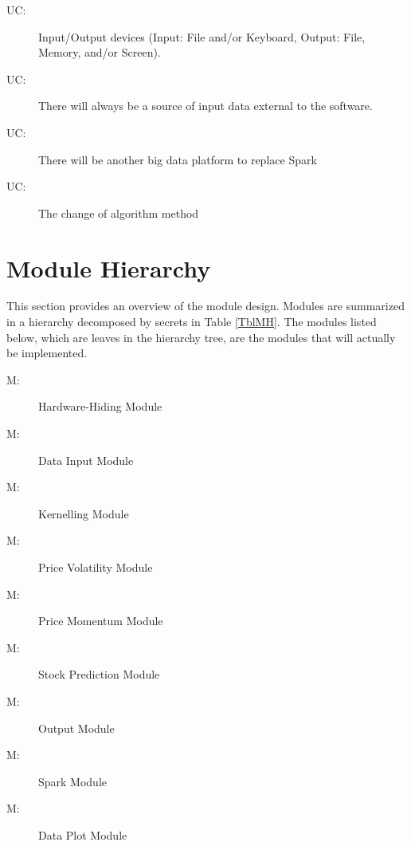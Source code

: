 \documentclass[12pt, titlepage]{article}
\newcounter{ucnum}
\newcommand{\uctheucnum}{UC\theucnum}
\newcounter{mnum}
\newcommand{\mthemnum}{M\themnum}
\begin{document}
\begin{description}
\item[ \uctheucnum \label{UC1}:] Input/Output devices
(Input: File and/or Keyboard, Output: File, Memory, and/or Screen).
\item[ \uctheucnum \label{UC2}:] There will always be
a source of input data external to the software.
\item[ \uctheucnum \label{UC3}:] There will be another big data platform to replace Spark
\item[ \uctheucnum \label{UC4}:] The change of algorithm method
\end{description}

\section{Module Hierarchy} \label{SecMH}

This section provides an overview of the module design. Modules are summarized
in a hierarchy decomposed by secrets in Table \ref{TblMH}. The modules listed
below, which are leaves in the hierarchy tree, are the modules that will
actually be implemented.

\begin{description}
\item [ \mthemnum \label{mHH}:] Hardware-Hiding Module
\item [ \mthemnum \label{mInput}:] Data Input Module
\item [ \mthemnum \label{mKernelling}:]Kernelling Module
\item [ \mthemnum \label{mVolatility}:] Price Volatility Module
\item [ \mthemnum \label{mMomentum}:] Price Momentum Module
\item [ \mthemnum \label{mPrediction}:] Stock Prediction Module
\item [ \mthemnum \label{mOutput}:] Output Module
\item [ \mthemnum \label{mSpark}:] Spark Module
\item [ \mthemnum \label{mPlot}:] Data Plot Module
\end{description}
\end{document}
